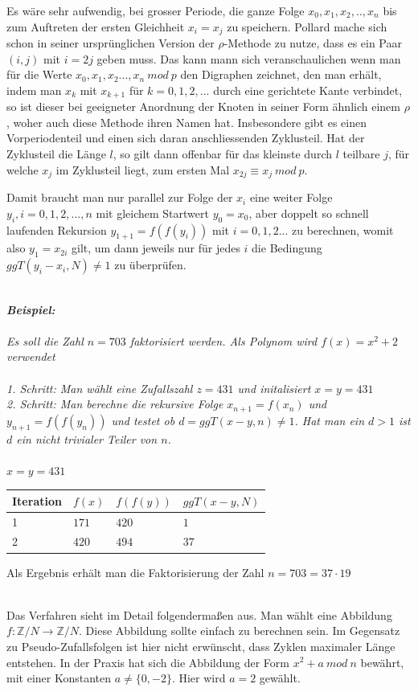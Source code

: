 \documentclass[10pt, bigheadings]{scrartcl}
\begin{document}
Es wäre sehr aufwendig, bei grosser Periode, die ganze Folge $x_0, x_1, x_2,.., x_n$
bis zum Auftreten der ersten Gleichheit $x_i = x_j$ zu speichern.
Pollard mache sich schon in seiner ursprünglichen
Version der $\rho$-Methode zu nutze, dass es ein Paar $(i,j)$ mit $i=2j$ geben
muss. Das kann mann sich veranschaulichen wenn man für die Werte
$x_0, x_1, x_2..., x_n\ mod\ p$ den Digraphen zeichnet, den man erhält,
indem man $x_k$ mit $x_{k+1}$ für $k=0,1,2,...$ durch eine  gerichtete Kante
verbindet, so ist dieser bei geeigneter Anordnung der Knoten in seiner Form ähnlich
einem $\rho$, woher auch diese Methode ihren Namen hat. Insbesondere gibt es einen
Vorperiodenteil und einen sich daran anschliessenden Zyklusteil. Hat der Zyklusteil die
Länge $l$, so gilt dann offenbar für das kleinste durch $l$ teilbare $j$, für welche
$x_j$ im Zyklusteil liegt, zum ersten Mal $x_{2j} \equiv x_j\ mod\ p$.

Damit braucht man nur parallel zur Folge der $x_i$ eine weiter Folge $y_i,i=0,1,2,..., n$
mit gleichem Startwert $y_0 = x_0$, aber doppelt so schnell laufenden Rekursion
$y_{1+1} = f(f(y_i))$ mit $i=0,1,2...$ zu berechnen, womit also $y_1 = x_{2i}$ gilt,
um dann jeweils nur für jedes $i$ die Bedingung $ggT(y_i-x_i, N) \neq 1$ zu
überprüfen.\\\\
{\it
\textbf{Beispiel:}\\\\
Es soll die Zahl $n=703$ faktorisiert werden. Als Polynom wird $f(x) = x^2 + 2$
verwendet\\\\
1. Schritt: Man wählt eine Zufallszahl $z = 431$ und initalisiert $x = y = 431$\\
2. Schritt: Man berechne die rekursive Folge $x_{n+1} = f(x_n)$ und $y_{n+1} = f(f(y_n))$
 und testet ob $d = ggT(x-y,n) \neq 1$. Hat man ein $d>1$ ist $d$ ein
 nicht trivialer Teiler von $n$.\\\\
$x = y = 431$
\begin{center}
\begin{tabular}{l|l|l|l}
Iteration & $f(x)$ & $f(f(y))$ & $ggT(x-y, N)$\\
\hline
1 & $171$ & $420$ & $1$\\
2 & $420$ & $494$ & $37$\\
\end{tabular}
\end{center}
Als Ergebnis erhält man die Faktorisierung der Zahl $n=703 = 37\cdot 19$\\\\
}
Das Verfahren sieht im Detail folgendermaßen aus. Man wählt
eine Abbildung $f:{\mathbb Z}/N \rightarrow {\mathbb Z}/N$. Diese Abbildung
sollte einfach zu berechnen sein. Im Gegensatz zu Pseudo-Zufallsfolgen ist
hier nicht erwünscht, dass Zyklen maximaler Länge entstehen. In der Praxis
hat sich die Abbildung der Form $x^2+a\ mod\ n$ bewährt, mit einer Konstanten
$a\neq \{0,-2\}$. Hier wird $a = 2$ gewählt.
\end{document}
